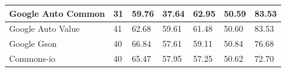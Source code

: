 \documentclass[conference,draftclsnofoot,onecolumn]{IEEEtran}
\begin{document}
\begin{table}[ht]
\begin{tabular}{|l|l|l|l|l|l|l|}
Google Auto   Common  & 31                                                                                               & 59.76                                                                                                                           & 37.64                                                                                                                                  & 62.95                                                                                      & 50.59                                                                                        & 83.53                                                                                       \\ \hline
Google Auto   Value   & 41                                                                                               & 62.68                                                                                                                           & 59.61                                                                                                                                  & 61.48                                                                                      & 50.60                                                                                        & 83.53                                                                                       \\ \hline
Google Gson           & 40                                                                                               & 66.84                                                                                                                           & 57.61                                                                                                                                  & 59.11                                                                                      & 50.84                                                                                        & 76.68                                                                                       \\ \hline
Commons-io            & 40                                                                                               & 65.47                                                                                                                           & 57.95                                                                                                                                  & 57.25                                                                                      & 50.62                                                                                        & 72.70                                                                                       \\ \hline

\end{tabular}
\end{table}
\end{document}
